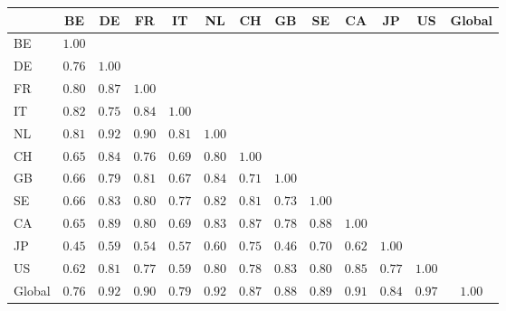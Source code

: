 \footnotesize
\setlength{\tabcolsep}{4pt}
\begin{tabular}{l cccccccccccc}
  \toprule
  & BE & DE & FR & IT & NL & CH & GB & SE & CA & JP & US & Global \\
  \midrule
  BE     & $1.00$ &        &        &        &        &        &        &        &        &        &        &        \\
  DE     & $0.76$ & $1.00$ &        &        &        &        &        &        &        &        &        &        \\
  FR     & $0.80$ & $0.87$ & $1.00$ &        &        &        &        &        &        &        &        &        \\
  IT     & $0.82$ & $0.75$ & $0.84$ & $1.00$ &        &        &        &        &        &        &        &        \\
  NL     & $0.81$ & $0.92$ & $0.90$ & $0.81$ & $1.00$ &        &        &        &        &        &        &        \\
  CH     & $0.65$ & $0.84$ & $0.76$ & $0.69$ & $0.80$ & $1.00$ &        &        &        &        &        &        \\
  GB     & $0.66$ & $0.79$ & $0.81$ & $0.67$ & $0.84$ & $0.71$ & $1.00$ &        &        &        &        &        \\
  SE     & $0.66$ & $0.83$ & $0.80$ & $0.77$ & $0.82$ & $0.81$ & $0.73$ & $1.00$ &        &        &        &        \\
  CA     & $0.65$ & $0.89$ & $0.80$ & $0.69$ & $0.83$ & $0.87$ & $0.78$ & $0.88$ & $1.00$ &        &        &        \\
  JP     & $0.45$ & $0.59$ & $0.54$ & $0.57$ & $0.60$ & $0.75$ & $0.46$ & $0.70$ & $0.62$ & $1.00$ &        &        \\
  US     & $0.62$ & $0.81$ & $0.77$ & $0.59$ & $0.80$ & $0.78$ & $0.83$ & $0.80$ & $0.85$ & $0.77$ & $1.00$ &        \\
  Global & $0.76$ & $0.92$ & $0.90$ & $0.79$ & $0.92$ & $0.87$ & $0.88$ & $0.89$ & $0.91$ & $0.84$ & $0.97$ & $1.00$ \\
  \bottomrule
\end{tabular}
